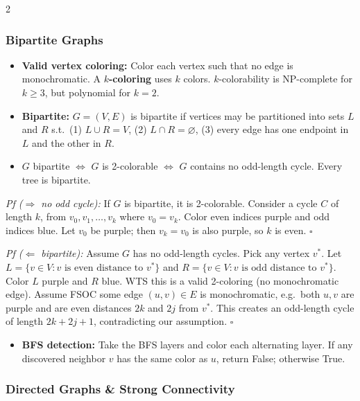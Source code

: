 \documentclass[9pt]{article}
\begin{document}
\begin{multicols}{2}
\subsubsection*{Bipartite Graphs}

\begin{itemize}
  \item \textbf{Valid vertex coloring:} Color each vertex such that no edge is monochromatic. A \textbf{$k$-coloring} uses $k$ colors. $k$-colorability is NP-complete for $k\ge3$, but polynomial for $k=2$.
  \item \textbf{Bipartite:} $G=(V,E)$ is bipartite if vertices may be partitioned into sets $L$ and $R$ s.t.\ (1) $L\cup R=V$, (2) $L\cap R=\varnothing$, (3) every edge has one endpoint in $L$ and the other in $R$.
  \item $G$ bipartite $\iff$ $G$ is 2-colorable $\iff$ $G$ contains no odd-length cycle. Every tree is bipartite.
\end{itemize}

\textit{Pf ($\Rightarrow$ no odd cycle):} If $G$ is bipartite, it is 2-colorable. Consider a cycle $C$ of length $k$, from $v_0,v_1,\dots,v_k$ where $v_0=v_k$. Color even indices purple and odd indices blue. Let $v_0$ be purple; then $v_k=v_0$ is also purple, so $k$ is even. $\square$

\textit{Pf ($\Leftarrow$ bipartite):} Assume $G$ has no odd-length cycles. Pick any vertex $v^*$. Let $L=\{v\in V: v\text{ is even distance to }v^*\}$ and $R=\{v\in V: v\text{ is odd distance to }v^*\}$. Color $L$ purple and $R$ blue. WTS this is a valid 2-coloring (no monochromatic edge). Assume FSOC some edge $(u,v)\in E$ is monochromatic, e.g.\ both $u,v$ are purple and are even distances $2k$ and $2j$ from $v^*$. This creates an odd-length cycle of length $2k+2j+1$, contradicting our assumption. $\square$

\begin{itemize}
  \item \textbf{BFS detection:} Take the BFS layers and color each alternating layer. If any discovered neighbor $v$ has the same color as $u$, return False; otherwise True.
\end{itemize}

\subsubsection*{Directed Graphs \& Strong Connectivity}


\end{multicols}
\end{document}
